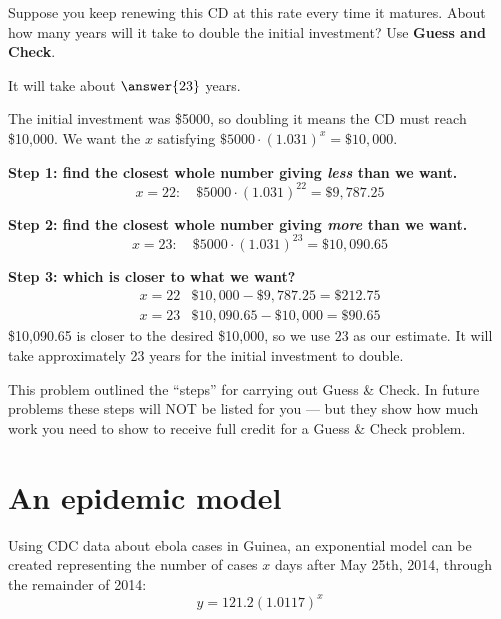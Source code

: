\documentclass[12pt]{ximera}
\begin{document}
\begin{problem}
Suppose you keep renewing this CD at this rate every time it matures. About how many
years will it take to double the initial investment? Use \textbf{Guess and Check}.

It will take about $\answer{23}$ years.

\begin{hint}
The initial investment was \$5000, so doubling it means the CD must reach \$10,000.
We want the $x$ satisfying $\$5000 \cdot (1.031)^{x} = \$10{,}000$.
\end{hint}

\begin{solution}
\textbf{Step 1: find the closest whole number giving \emph{less} than we want.}
\[
x = 22: \quad \$5000 \cdot (1.031)^{22} = \$9{,}787.25
\]

\textbf{Step 2: find the closest whole number giving \emph{more} than we want.}
\[
x = 23: \quad \$5000 \cdot (1.031)^{23} = \$10{,}090.65
\]

\textbf{Step 3: which is closer to what we want?}
\[
\begin{array}{ll}
x = 22 & \$10{,}000 - \$9{,}787.25 = \$212.75 \\
x = 23 & \$10{,}090.65 - \$10{,}000 = \$90.65
\end{array}
\]
\$10,090.65 is closer to the desired \$10,000, so we use $23$ as our estimate. It
will take approximately 23 years for the initial investment to double.
\end{solution}
\end{problem}

This problem outlined the ``steps'' for carrying out Guess \& Check. In future
problems these steps will NOT be listed for you --- but they show how much work you
need to show to receive full credit for a Guess \& Check problem.

\section*{An epidemic model}

Using CDC data about ebola cases in Guinea, an exponential model can be created
representing the number of cases $x$ days after May 25th, 2014, through the remainder
of 2014:
\[
y = 121.2(1.0117)^{x}
\]
\end{document}
